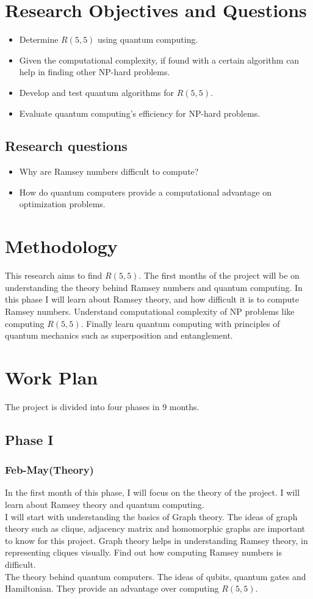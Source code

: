 \documentclass{Assignment}
\begin{document}
\section{Research Objectives and Questions}
\begin{itemize}
	\item Determine \( R(5,5) \) using quantum computing.
	\item Given the computational complexity, if found with a certain algorithm can help in finding other NP-hard problems.
	\item Develop and test quantum algorithms for $R(5,5)$.
	\item Evaluate quantum computing’s efficiency for NP-hard problems.
\end{itemize}
\subsection*{Research questions}
\begin{itemize}
\item Why are Ramsey numbers difficult to compute?
\item How do quantum computers provide a computational advantage on optimization problems.
\end{itemize}
\section{Methodology}
This research aims to find $ R(5,5)$.
The first months of the project will be on understanding the theory behind Ramsey numbers and quantum computing.
In this phase I will learn about Ramsey theory, and how difficult it is to compute Ramsey numbers.
Understand computational complexity of NP problems like computing $R(5,5)$.
Finally learn quantum computing with principles of quantum mechanics such as superposition and entanglement.
\section{Work Plan}
The project is divided into four phases in 9 months.
\subsection{Phase I}
\subsubsection*{Feb-May(Theory)}
In the first month of this phase, I will focus on the theory of the project.
I will learn about Ramsey theory and quantum computing.
\\
I will start with understanding the basics of Graph theory.
The ideas of graph theory such as clique, adjacency matrix and homomorphic graphs are important to know for this project.
Graph theory helps in understanding Ramsey theory, in representing cliques visually.
Find out how computing Ramsey numbers is difficult.
\\
The theory behind quantum computers.
The ideas of qubits, quantum gates and Hamiltonian.
They provide an advantage over computing $R(5,5)$.
\\
\end{document}
